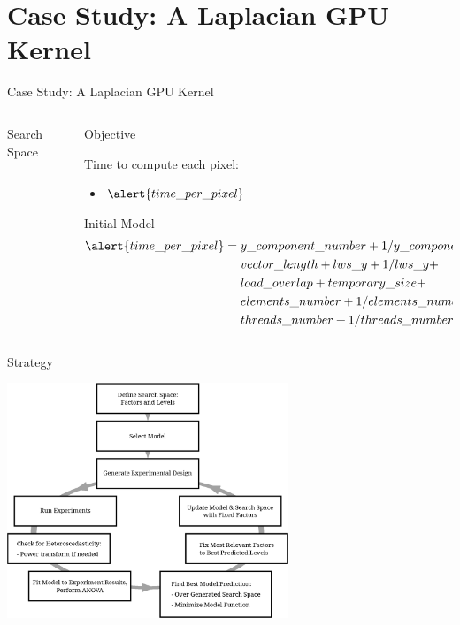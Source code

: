 \documentclass[10pt, compress, aspectratio=169, xcolor={table,usenames,dvipsnames}]{beamer}
\begin{document}
\section{Case Study: A Laplacian GPU Kernel}
\label{sec:org5122d96}
\begin{frame}[label={sec:org656881a}]{Case Study: A Laplacian GPU Kernel}
\begin{columns}
\begin{column}{0.5\columnwidth}
\begin{block}{Search Space}
\vspace{-.2cm}


\end{block}
\end{column}
\begin{column}{0.5\columnwidth}
\begin{block}{Objective}
\vspace{.2cm}

Time to compute each pixel:
\begin{itemize}
\item \(\alert{time\_per\_pixel}\)
\end{itemize}

\begin{block}{Initial Model}
\scriptsize
\begin{align*}
      \alert{time\_per\_pixel} = & \; y\_component\_number + 1 / y\_component\_number + \\
                        & \; vector\_length + lws\_y + 1 / lws\_y + \\
                        & \; load\_overlap + temporary\_size + \\
                        & \; elements\_number + 1 / elements\_number + \\
                        & \; threads\_number + 1 / threads\_number
\end{align*}
\normalsize
\end{block}
\end{block}
\end{column}
\end{columns}
\end{frame}
\begin{frame}[label={sec:org87ede37}]{Strategy}
\begin{center}
\includegraphics[width=0.63\textwidth]{../img/doe_anova_strategy.eps}
\end{center}
\end{frame}
\end{document}
